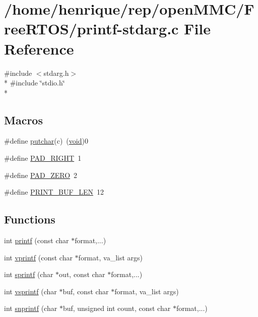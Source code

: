 \hypertarget{printf-stdarg_8c}{\section{/home/henrique/rep/open\-M\-M\-C/\-Free\-R\-T\-O\-S/printf-\/stdarg.c File Reference}
\label{printf-stdarg_8c}
}
{\ttfamily \#include $<$stdarg.\-h$>$}\\*
{\ttfamily \#include \char`\"{}stdio.\-h\char`\"{}}\\*
\subsection*{Macros}
\begin{DoxyCompactItemize}
\item 
\#define \hyperlink{printf-stdarg_8c_a568f021a83b2c22e1e700d12559d660a}{putchar}(c)~(\hyperlink{Paradigm_2Tern__EE_2small_2portmacro_8h_a14d32f8130d3c0b212cfc751730b5b49}{void})0
\item 
\#define \hyperlink{printf-stdarg_8c_a6fd5dddc97219412ab1c4483ce144aef}{P\-A\-D\-\_\-\-R\-I\-G\-H\-T}~1
\item 
\#define \hyperlink{printf-stdarg_8c_a0b08e2c1689b9348d321cdc8846950af}{P\-A\-D\-\_\-\-Z\-E\-R\-O}~2
\item 
\#define \hyperlink{printf-stdarg_8c_a5bf270eda1fe4ed63535e31fab16433e}{P\-R\-I\-N\-T\-\_\-\-B\-U\-F\-\_\-\-L\-E\-N}~12
\end{DoxyCompactItemize}
\subsection*{Functions}
\begin{DoxyCompactItemize}
\item 
int \hyperlink{printf-stdarg_8c_a98631211a4a8aee62f572375d5b637be}{printf} (const char $\ast$format,...)
\item 
int \hyperlink{printf-stdarg_8c_aae4ab8b56862ed0a04505cafb8a05112}{vprintf} (const char $\ast$format, va\-\_\-list args)
\item 
int \hyperlink{printf-stdarg_8c_aa0649118bc3728b2a62af0b47606ff51}{sprintf} (char $\ast$out, const char $\ast$format,...)
\item 
int \hyperlink{printf-stdarg_8c_a557dd665397e14bc2f8ef9d31b6c8e3e}{vsprintf} (char $\ast$buf, const char $\ast$format, va\-\_\-list args)
\item 
int \hyperlink{printf-stdarg_8c_a0b3526078beb75778277d06a066c9508}{snprintf} (char $\ast$buf, unsigned int count, const char $\ast$format,...)
\end{DoxyCompactItemize}


